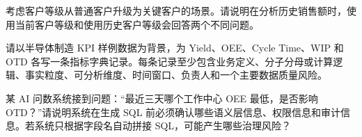 \begin{exercise}
考虑客户等级从普通客户升级为关键客户的场景。请说明在分析历史销售额时，使用当前客户等级和使用历史客户等级会回答两个不同问题。
\end{exercise}

\begin{exercise}
请以半导体制造 KPI 样例数据为背景，为 Yield、OEE、Cycle Time、WIP 和 OTD 各写一条指标字典记录。每条记录至少包含业务定义、分子分母或计算逻辑、事实粒度、可分析维度、时间窗口、负责人和一个主要数据质量风险。
\end{exercise}

\begin{exercise}
某 AI 问数系统接到问题：“最近三天哪个工作中心 OEE 最低，是否影响 OTD？”请说明系统在生成 SQL 前必须确认哪些语义层信息、权限信息和审计信息。若系统只根据字段名自动拼接 SQL，可能产生哪些治理风险？
\end{exercise}
